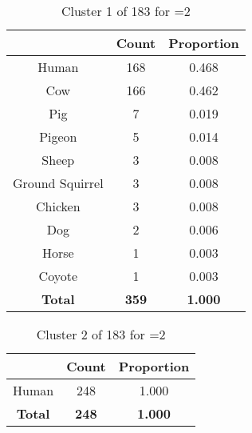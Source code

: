 \begin{table}[ht!]
\centering
\begin{tabular}{|c|c|c|}
\hline
\bf \Spec{} &\bf Count &\bf Proportion\\ \hline \hline
Human & 168 & 0.468\\ \hline
Cow & 166 & 0.462\\ \hline
Pig & 7 & 0.019\\ \hline
Pigeon & 5 & 0.014\\ \hline
Sheep & 3 & 0.008\\ \hline
Ground Squirrel & 3 & 0.008\\ \hline
Chicken & 3 & 0.008\\ \hline
Dog & 2 & 0.006\\ \hline
Horse & 1 & 0.003\\ \hline
Coyote & 1 & 0.003\\ \hline
\hline
\bf Total & \bf 359 & \bf 1.000\\ \hline
\end{tabular}
\label{tab:cluster:1:2}
\caption{Cluster 1 of 183 for \minneigh{}=2}
\end{table}

\begin{table}[ht!]
\centering
\begin{tabular}{|c|c|c|}
\hline
\bf \Spec{} &\bf Count &\bf Proportion\\ \hline \hline
Human & 248 & 1.000\\ \hline
\hline
\bf Total & \bf 248 & \bf 1.000\\ \hline
\end{tabular}
\label{tab:cluster:2:2}
\caption{Cluster 2 of 183 for \minneigh{}=2}
\end{table}

